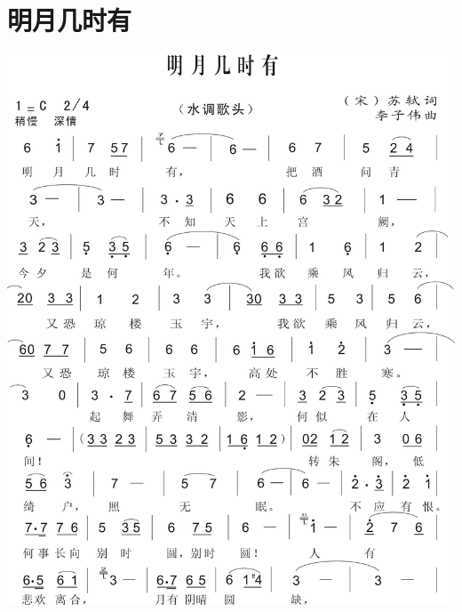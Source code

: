 \documentclass[cn,pad,twocol]{elegantbook}
\begin{document}
\section{明月几时有}                \includegraphics[width=\textwidth]{dongxiao/20200411-明月几时有.jpg}
\end{document}
